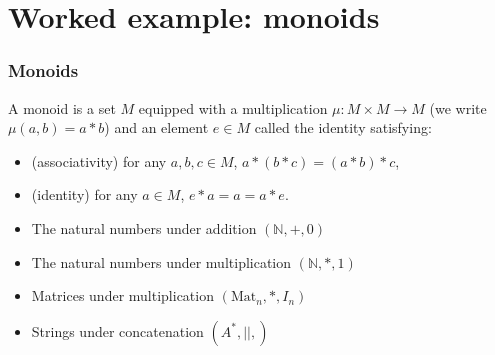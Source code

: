 \documentclass{beamer}
\newcommand{\NN}{\mathbb{N}}
\begin{document}
\section{Worked example: monoids}

\begin{frame}
    \frametitle{Monoids}
    \begin{definition}
        A monoid is a set \(M\) equipped with a multiplication \(\mu : M \times M \to M\) (we write \(\mu(a, b) = a * b\)) and an element \(e \in M\) called the identity satisfying:
        \begin{itemize}
            \item (associativity) for any \(a, b, c \in M\), \(a * (b * c) = (a * b) * c\),
            \item (identity) for any \(a \in M\), \(e * a = a = a * e\).
        \end{itemize}
    \end{definition}
    \pause
    \begin{example}
        \begin{itemize}
            \item The natural numbers under addition \((\NN, +, 0)\)
            \item The natural numbers under multiplication \((\NN, *, 1)\)
            \item Matrices under multiplication \((\mathrm{Mat}_n, *, I_n)\)
            \item Strings under concatenation \((A^*, ||, )\)
        \end{itemize}
    \end{example}
\end{frame}
\end{document}
